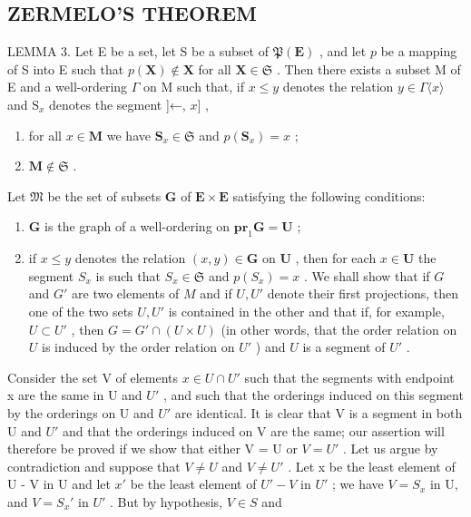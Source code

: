 \subsection{ZERMELO'S THEOREM}

LEMMA 3. Let E be a set, let S be a subset of \(\mathfrak{P}(\mathbf{E})\) , and let \(p\) be a mapping of S into E such that \(p(\mathbf{X}) \notin \mathbf{X}\) for all \(\mathbf{X} \in \mathfrak{S}\) . Then there exists a subset M of E and a well-ordering \(\Gamma\) on M such that, if \(x \leqslant y\) denotes the relation \(y \in \Gamma\langle x \rangle\) and \(\mathrm{S}_x\) denotes the segment {]}←, \(x]\) ,

\begin{enumerate}
\def\labelenumi{(\arabic{enumi})}
\item
  for all \(x \in \mathbf{M}\) we have \(\mathbf{S}_x \in \mathfrak{S}\) and \(p(\mathbf{S}_x) = x\) ;
\item
  \(\mathbf{M} \notin \mathfrak{S}\) .
\end{enumerate}

Let \(\mathfrak{M}\) be the set of subsets \(\mathbf{G}\) of \(\mathbf{E} \times \mathbf{E}\) satisfying the following conditions:

\begin{enumerate}
\def\labelenumi{(\alph{enumi})}
\item
  \(\mathbf{G}\) is the graph of a well-ordering on \(\mathbf{pr}_1\mathbf{G} = \mathbf{U}\) ;
\item
  if \(x \leqslant y\) denotes the relation \((x, y) \in \mathbf{G}\) on \(\mathbf{U}\) , then for each \(x \in \mathbf{U}\) the segment \(S_x\) is such that \(S_x \in \mathfrak{S}\) and \(p(S_x) = x\) . We shall show that if \(G\) and \(G'\) are two elements of \(M\) and if \(U, U'\) denote their first projections, then one of the two sets \(U, U'\) is contained in the other and that if, for example, \(U \subset U'\) , then \(G = G' \cap (U \times U)\) (in other words, that the order relation on \(U\) is induced by the order relation on \(U'\) ) and \(U\) is a segment of \(U'\) .
\end{enumerate}

Consider the set V of elements \(x \in U \cap U'\) such that the segments with endpoint x are the same in U and \(U'\) , and such that the orderings induced on this segment by the orderings on U and \(U'\) are identical. It is clear that V is a segment in both U and \(U'\) and that the orderings induced on V are the same; our assertion will therefore be proved if we show that either V = U or \(V = U'\) . Let us argue by contradiction and suppose that \(V \neq U\) and \(V \neq U'\) . Let x be the least element of U - V in U and let \(x'\) be the least element of \(U' - V\) in \(U'\) ; we have \(V = S_x\) in U, and \(V = S_x'\) in \(U'\) . But by hypothesis, \(V \in S\) and

